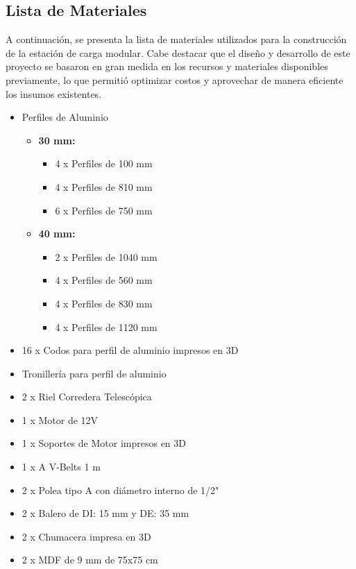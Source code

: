 \subsection{Lista de Materiales}
A continuación, se presenta la lista de materiales utilizados para la construcción de la estación de carga modular. Cabe destacar que el diseño y desarrollo de este proyecto se basaron en gran medida en los recursos y materiales disponibles previamente, lo que permitió optimizar costos y aprovechar de manera eficiente los insumos existentes.
\begin{itemize}
    \item Perfiles de Aluminio
        \begin{itemize}
            \item \textbf{30 mm:}
            \begin{itemize}
            \item 4 x Perfiles de 100 mm
            \item 4 x Perfiles de 810 mm
            \item 6 x Perfiles de 750 mm
            \end{itemize}
            \item \textbf{40 mm:}
            \begin{itemize}
            \item 2 x Perfiles de 1040 mm
            \item 4 x Perfiles de 560 mm
            \item 4 x Perfiles de 830 mm
            \item 4 x Perfiles de 1120 mm
            \end{itemize}
        \end{itemize}
    \item 16 x Codos para perfil de aluminio impresos en 3D
    \item Tronillería para perfil de aluminio
    \item 2 x Riel Corredera Telescópica
    \item 1 x Motor de 12V
    \item 1 x Soportes de Motor impresos en 3D
    \item 1 x A V-Belts 1 m 
    \item 2 x Polea tipo A con diámetro interno de 1/2"
    \item 2 x Balero de DI: 15 mm y DE: 35 mm
    \item 2 x Chumacera impresa en 3D
    \item 2 x MDF de 9 mm de 75x75 cm

\end{itemize}
